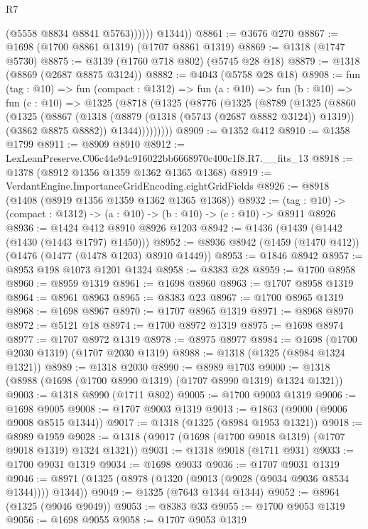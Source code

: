 \begin{lexlean}{R7}
\begin{coremodule}
                  (@5558 @8834 @8841 @5763))))))
        @1344))
@8861 := @3676 @270
@8867 := @1698 (@1700 @8861 @1319) (@1707 @8861 @1319)
@8869 := @1318 (@1747 @5730)
@8875 := @3139 (@1760 @718 @802) (@5745 @28 @18)
@8879 := @1318 (@8869 (@2687 @8875 @3124))
@8882 := @4043 (@5758 @28 @18)
@8908 := fun (tag : @10) =>
  fun (compact : @1312) =>
  fun (a : @10) =>
  fun (b : @10) =>
  fun (c : @10) =>
  @1325
    (@8718
      (@1325
        (@8776
          (@1325
            (@8789
              (@1325
                (@8860
                  (@1325
                    (@8867
                      (@1318 (@8879 (@1318 (@5743 (@2687 @8882 @3124)) @1319)) (@3862 @8875 @8882))
                      @1344)))))))))
@8909 := @1352 @412
@8910 := @1358 @1799
@8911 := @8909 @8910
@8912 := LexLeanPreserve.C06c44e94c916022bb6668970c400c1f8.R7.__fits_13
@8918 := @1378 (@8912 @1356 @1359 @1362 @1365 @1368)
@8919 := VerdantEngine.ImportanceGridEncoding.eightGridFields
@8926 := @8918 (@1408 (@8919 @1356 @1359 @1362 @1365 @1368))
@8932 := (tag : @10) -> (compact : @1312) -> (a : @10) -> (b : @10) -> (c : @10) -> @8911 @8926
@8936 := @1424 @412 @8910 @8926 @1203
@8942 := @1436 (@1439 (@1442 (@1430 (@1443 @1797) @1450)))
@8952 := @8936 @8942 (@1459 (@1470 @412)) (@1476 (@1477 (@1478 @1203) @8910 @1449))
@8953 := @1846 @8942
@8957 := @8953 @198 @1073 @1201 @1324
@8958 := @8383 @28
@8959 := @1700 @8958
@8960 := @8959 @1319
@8961 := @1698 @8960
@8963 := @1707 @8958 @1319
@8964 := @8961 @8963
@8965 := @8383 @23
@8967 := @1700 @8965 @1319
@8968 := @1698 @8967
@8970 := @1707 @8965 @1319
@8971 := @8968 @8970
@8972 := @5121 @18
@8974 := @1700 @8972 @1319
@8975 := @1698 @8974
@8977 := @1707 @8972 @1319
@8978 := @8975 @8977
@8984 := @1698 (@1700 @2030 @1319) (@1707 @2030 @1319)
@8988 := @1318 (@1325 (@8984 @1324 @1321))
@8989 := @1318 @2030
@8990 := @8989 @1703
@9000 := @1318 (@8988 (@1698 (@1700 @8990 @1319) (@1707 @8990 @1319) @1324 @1321))
@9003 := @1318 @8990 (@1711 @802)
@9005 := @1700 @9003 @1319
@9006 := @1698 @9005
@9008 := @1707 @9003 @1319
@9013 := @1863 (@9000 (@9006 @9008 @8515 @1344))
@9017 := @1318 (@1325 (@8984 @1953 @1321))
@9018 := @8989 @1959
@9028 := @1318 (@9017 (@1698 (@1700 @9018 @1319) (@1707 @9018 @1319) @1324 @1321))
@9031 := @1318 @9018 (@1711 @931)
@9033 := @1700 @9031 @1319
@9034 := @1698 @9033
@9036 := @1707 @9031 @1319
@9046 := @8971 (@1325 (@8978 (@1320 (@9013 (@9028 (@9034 @9036 @8534 @1344)))) @1344))
@9049 := @1325 (@7643 @1344 @1344)
@9052 := @8964 (@1325 (@9046 @9049))
@9053 := @8383 @33
@9055 := @1700 @9053 @1319
@9056 := @1698 @9055
@9058 := @1707 @9053 @1319

\end{coremodule}
\end{lexlean}
